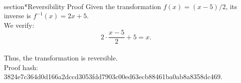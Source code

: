 
\\section*{Reversibility Proof}
Given the transformation $f(x) = (x - 5)/2$, its inverse is $f^{-1}(x) = 2x + 5$.\\
We verify:
$$2 \cdot \frac{x - 5}{2} + 5 = x.$$\\
Thus, the transformation is reversible.\\
Proof hash: 3824e7c364d0d166a2dccd3053fdd7903c00ed63ecb88461ba0ab8a8358dc469.

